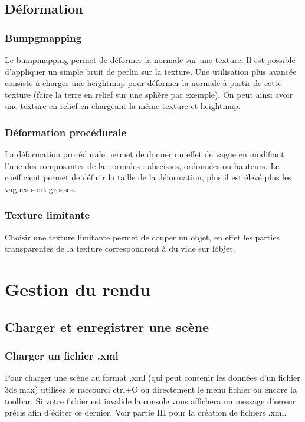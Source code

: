 \documentclass{report}
\begin{document}
\chapter{D\'eformation}
\section{Bumpgmapping}
Le bumpmapping permet de d\'eformer la normale sur une texture.
\newline Il est possible d'appliquer un simple bruit de perlin sur la texture.
\newline Une utilisation plus avanc\'ee consiste \`a charger une heightmap pour d\'eformer la normale \`a partir de cette texture (faire la terre en relief sur une sph\`ere par exemple).
\newline On peut ainsi avoir une texture en relief en chargeant la m\^eme texture et heightmap.
\section{D\'eformation proc\'edurale}
La d\'eformation proc\'edurale permet de donner un effet de vague en modifiant l'une des composantes de la normales : abscisses, ordonn\'ees ou hauteurs.
\newline Le coefficient permet de d\'efinir la taille de la d\'eformation, plus il est \'elev\'e plus les vagues sont grosses.
\section{Texture limitante}
Choisir une texture limitante permet de couper un objet, en effet les parties transparentes de la texture correspondront \`a du vide sur l\'objet.
\part{Gestion du rendu}
\chapter{Charger et enregistrer une sc\`ene}
\section{Charger un fichier .xml}
Pour charger une sc\`ene au format .xml (qui peut contenir les donn\'ees d'un fichier 3ds max) utilisez le raccourci ctrl+O ou directement le menu fichier ou encore la toolbar.
Si votre fichier est invalide la console vous affichera un message d'erreur pr\'ecis afin d'\'editer ce dernier.
Voir partie III pour la cr\'eation de fichiers .xml.
\end{document}
